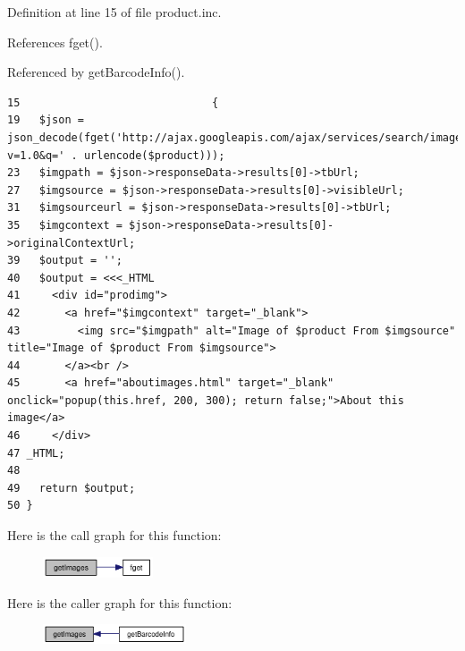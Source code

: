 Definition at line 15 of file product.inc.

References fget().

Referenced by getBarcodeInfo().

\begin{Code}\begin{verbatim}15                              {
19   $json = json_decode(fget('http://ajax.googleapis.com/ajax/services/search/images?v=1.0&q=' . urlencode($product)));
23   $imgpath = $json->responseData->results[0]->tbUrl;
27   $imgsource = $json->responseData->results[0]->visibleUrl;
31   $imgsourceurl = $json->responseData->results[0]->tbUrl;
35   $imgcontext = $json->responseData->results[0]->originalContextUrl;
39   $output = '';
40   $output = <<<_HTML
41     <div id="prodimg">
42       <a href="$imgcontext" target="_blank">
43         <img src="$imgpath" alt="Image of $product From $imgsource" title="Image of $product From $imgsource">
44       </a><br />
45       <a href="aboutimages.html" target="_blank" onclick="popup(this.href, 200, 300); return false;">About this image</a>
46     </div>
47 _HTML;
48 
49   return $output;
50 }\end{verbatim}
\end{Code}




Here is the call graph for this function:\nopagebreak
\begin{figure}[H]
\begin{center}
\leavevmode
\includegraphics[width=92pt]{product_8inc_9dbb778854cfe105058d7161ca8f058c_cgraph}
\end{center}
\end{figure}


Here is the caller graph for this function:\nopagebreak
\begin{figure}[H]
\begin{center}
\leavevmode
\includegraphics[width=120pt]{product_8inc_9dbb778854cfe105058d7161ca8f058c_icgraph}
\end{center}
\end{figure}
